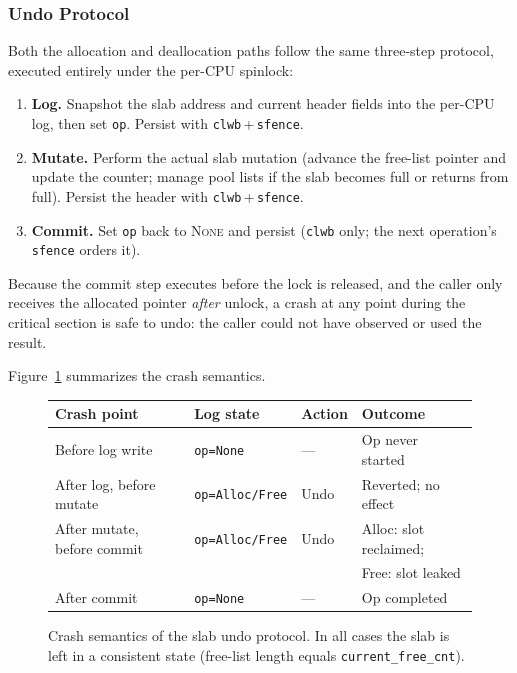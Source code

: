 \subsubsection{Undo Protocol}

Both the allocation and deallocation paths follow the same three-step
protocol, executed entirely under the per-CPU spinlock:

\begin{enumerate}
  \item \textbf{Log.}\;
        Snapshot the slab address and current header fields into the
        per-CPU log, then set \texttt{op}.
        Persist with \texttt{clwb}\,+\,\texttt{sfence}.
  \item \textbf{Mutate.}\;
        Perform the actual slab mutation (advance the free-list pointer
        and update the counter; manage pool lists if the slab becomes
        full or returns from full).
        Persist the header with \texttt{clwb}\,+\,\texttt{sfence}.
  \item \textbf{Commit.}\;
        Set \texttt{op} back to \textsc{None} and persist
        (\texttt{clwb} only; the next operation's \texttt{sfence}
        orders it).
\end{enumerate}

\noindent
Because the commit step executes before the lock is released,
and the caller only receives the allocated pointer \emph{after} unlock,
a crash at any point during the critical section is safe to undo:
the caller could not have observed or used the result.

Figure~\ref{fig:slab-crash-semantics} summarizes the crash semantics.

\begin{figure}[t]
\centering
\small
\begin{tabular}{@{}llll@{}}
\toprule
\textbf{Crash point} & \textbf{Log state} & \textbf{Action} & \textbf{Outcome} \\
\midrule
Before log write       & \texttt{op=None}  & ---   & Op never started \\
After log, before mutate & \texttt{op=Alloc/Free} & Undo & Reverted; no effect \\
After mutate, before commit & \texttt{op=Alloc/Free} & Undo & Alloc: slot reclaimed; \\
                       &                   &       & Free: slot leaked \\
After commit           & \texttt{op=None}  & ---   & Op completed \\
\bottomrule
\end{tabular}
\caption{Crash semantics of the slab undo protocol.
         In all cases the slab is left in a consistent state
         (free-list length equals \texttt{current\_free\_cnt}).}
\label{fig:slab-crash-semantics}
\end{figure}

